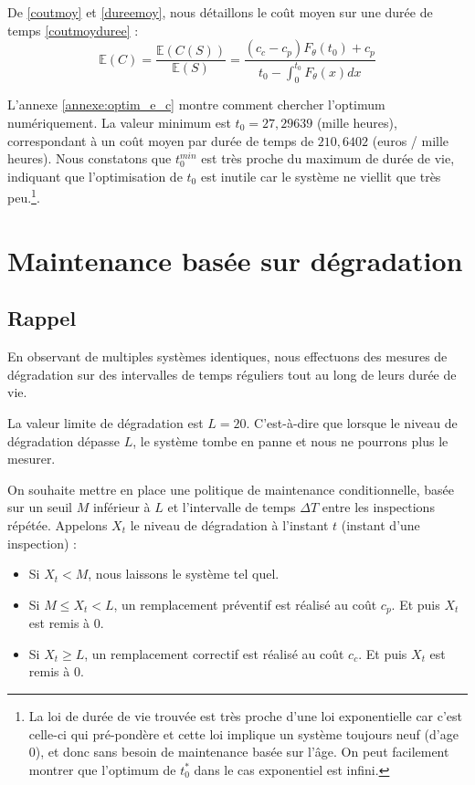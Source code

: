 \documentclass[10pt,a4paper]{article}
\begin{document}
De \eqref{coutmoy} et \eqref{dureemoy}, nous détaillons le coût moyen sur une durée de temps \eqref{coutmoyduree} :
\begin{equation}
    \label{coutmoydureedet}
    \mathbb{E}\left( C \right) = \frac{{\mathbb{E}\left( {C\left( S \right)} \right)}}{{\mathbb{E}\left( S \right)}} = \frac{{\left( {{c_c} - {c_p}} \right){F_\theta }\left( {{t_0}} \right) + {c_p}}}{{{t_0} - \int_0^{{t_0}} {{F_\theta }\left( x \right)dx} }}
\end{equation}

L'annexe \eqref{annexe:optim_e_c} montre comment chercher l'optimum numériquement. La valeur minimum est $t_0 = 27,29639$ (mille heures), correspondant à un coût moyen par durée de temps de $210,6402$ (euros / mille heures). Nous constatons que $t_0^{min}$ est très proche du maximum de durée de vie, indiquant que l'optimisation de $t_0$ est inutile car le système ne viellit que très peu.\footnote{La loi de durée de vie trouvée est très proche d'une loi exponentielle car c'est celle-ci qui pré-pondère et cette loi implique un système toujours neuf (d'age 0), et donc sans besoin de maintenance basée sur l'âge. On peut facilement montrer que l'optimum de $t_{0}^{*}$ dans le cas exponentiel est infini.}.

\clearpage

\section{Maintenance basée sur dégradation}
\subsection{Rappel}
En observant de multiples systèmes identiques, nous effectuons des mesures de dégradation sur des intervalles de temps réguliers tout au long de leurs durée de vie.

La valeur limite de dégradation est $L=20$. C'est-à-dire que lorsque le niveau de dégradation dépasse $L$, le système tombe en panne et nous ne pourrons plus le mesurer.

On souhaite mettre en place une politique de maintenance conditionnelle, basée sur un seuil $M$ inférieur à $L$ et l'intervalle de temps $\Delta T$ entre les inspections répétée. Appelons $X_t$ le niveau de dégradation à l'instant $t$ (instant d'une inspection) :
\begin{itemize}
    \item Si $X_t < M$, nous laissons le système tel quel.
    \item Si $M \leq X_t < L$, un remplacement préventif est réalisé au coût $c_p$. Et puis $X_t$ est remis à $0$.
    \item Si $X_t \geq L$, un remplacement correctif est réalisé au coût $c_c$. Et puis $X_t$ est remis à $0$.
\end{itemize}
\end{document}
